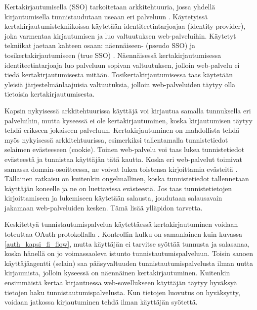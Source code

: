 Kertakirjautumisella (SSO) tarkoitetaan arkkitehtuuria, jossa yhdellä kirjautumisella tunnistaudutaan useaan eri palveluun \cite{sso}. Käytetyissä kertakirjautumistekniikoissa käytetään identiteetintarjoajaa (identity provider), joka varmentaa kirjautumisen ja luo valtuutuksen web-palveluihin. Käytetyt tekniikat jaetaan kahteen osaan: näennäiseen- (pseudo SSO) ja tosikertakirjautumiseen (true SSO) \cite{sso}. Näennäisessä kertakirjautumisessa identiteetintarjoaja luo palveluun sopivan valtuutuksen, jolloin web-palvelu ei tiedä kertakirjautumisesta mitään. Tosikertakirjautumisessa taas käytetään yleisiä järjestelmänlaajuisia valtuutuksia, jolloin web-palveluiden täytyy olla tietoisia kertakirjautumisesta.

Kapsin nykyisessä arkkitehtuurissa käyttäjä voi kirjautua samalla tunnuksella eri palveluihin, mutta kyseessä ei ole kertakirjautuminen, koska kirjautumisen täytyy tehdä erikseen jokaiseen palveluun. Kertakirjautuminen on mahdollista tehdä myös nykyisessä arkkitehtuurissa, esimerkiksi tallentamalla tunnistetiedot selaimen evästeeseen (cookie). Toinen web-palvelu voi taas lukea tunnistetiedot evästeestä ja tunnistaa käyttäjän tätä kautta. Koska eri web-palvelut toimivat samassa domain-osoitteessa, ne voivat lukea toistensa kirjoittamia evästeitä \cite{rfc6265}. Tällainen ratkaisu on kuitenkin ongelmallinen, koska tunnistetiedot tallennetaan käyttäjän koneelle ja ne on luettavissa evästeestä. Jos taas tunnistetietojen kirjoittamiseen ja lukemiseen käytetään salausta, joudutaan salausavain jakamaan web-palveluiden kesken. Tämä lisää ylläpidon tarvetta.

Keskitettyä tunnistautumispalvelua käytettäessä kertakirjautuminen voidaan toteuttaa OAuth-protokollalla \cite{distributed_web_security}. Kontrollin kulku on samanlainen kuin kuvassa \ref{auth_kapsi_fi_flow}, mutta käyttäjän ei tarvitse syöttää tunnusta ja salasanaa, koska hänellä on jo voimassaoleva istunto tunnistautumispalveluun. Toisin sanoen käyttäjäagentti (selain) saa pääsyvaltuuden tunnistautumispalvelusta ilman uutta kirjaumista, jolloin kyseessä on näennäinen kertakirjautuminen. Kuitenkin ensimmäistä kertaa kirjautuessa web-sovellukseen käyttäjän täytyy hyväksyä tietojen haku tunnistautumispalvelusta. Kun tietojen luovutus on hyväksytty, voidaan jatkossa kirjautuminen tehdä ilman käyttäjän syötettä.